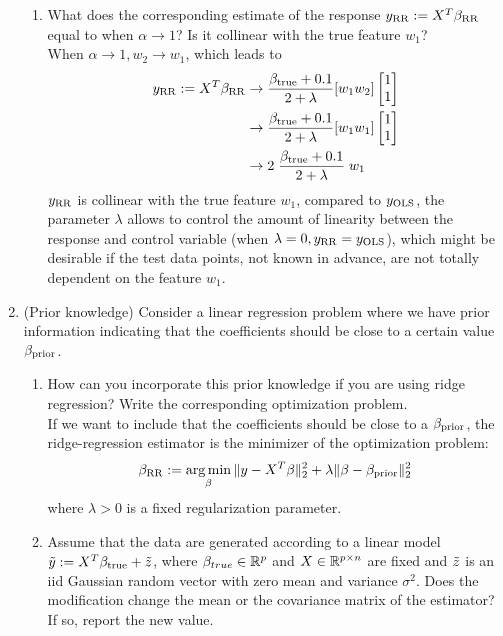 \documentclass[12pt,twoside]{article}
\begin{document}
\begin{enumerate}
\begin{enumerate}
  \item  What does the corresponding estimate of the response $y_{\operatorname{RR}} := X^T\beta_{\operatorname{RR}}$ equal to when $\alpha \rightarrow 1$? Is it collinear with the true feature $w_1$?\\
  \medskip
  When  $\alpha \rightarrow 1, w_2 \rightarrow w_1$, which leads to
 \begin{align*}
 	y_{\operatorname{RR}} := X^T\beta_{\operatorname{RR}}	&\rightarrow	\frac{ \beta_{\operatorname{true}} + 0.1}{ 2 + \lambda} [w_1 w_2]  \begin{bmatrix} 1  \\ 1 \end{bmatrix} \\
								&\rightarrow 	\frac{ \beta_{\operatorname{true}} + 0.1}{ 2 + \lambda} [w_1 w_1] \begin{bmatrix} 1  \\ 1 \end{bmatrix} \\
								&\rightarrow 	2 \;  \frac{\beta_{\operatorname{true}} + 0.1}{ 2 + \lambda} \; w_1
 \end{align*}    
  $y_{\operatorname{RR}}$ is collinear with the true feature $w_1$, compared to $y_{\operatorname{OLS}}$, the parameter $\lambda$ allows to control the amount of linearity between the response and control variable (when $\lambda=0, y_{\operatorname{RR}} = y_{\operatorname{OLS}}$), which might be desirable if the test data points, not known in advance, are not totally dependent on the feature $w_1$.
  
  \end{enumerate} 
 
 \newpage
 
 \item (Prior knowledge) Consider a linear regression problem where we have prior information indicating that the coefficients should be close to a certain value $\beta_{\operatorname{prior}}$. 
 \begin{enumerate}
 
   \item How can you incorporate this prior knowledge if you are using ridge regression? Write the corresponding optimization problem.\\
 
  \medskip
   If we want to include that the coefficients should be close to a  $\beta_{\operatorname{prior}}$, the ridge-regression estimator is the minimizer of the optimization problem:
   $$\beta_{\operatorname{RR}} := \operatorname*{arg\,min}_\beta \| y - X^T \beta \|_2^2 + \lambda \| \beta - \beta_{\operatorname{prior}} \|_2^2$$
   where $\lambda > 0$ is a fixed regularization parameter.
   
   \item Assume that the data are generated according to a linear model $\tilde{ y }:= X^T \beta_{\operatorname{true}} + \tilde{ z }$, where $\beta_{true}\in \mathbb{R}^{p}$ and $X  \in \mathbb{R}^{p \times n}$ are fixed and $\tilde{ z }$ is an iid Gaussian random vector with zero mean and variance $\sigma^2$. Does the modification change the mean or the covariance matrix of the estimator? If so, report the new value.\\
   

\end{enumerate}
\end{enumerate}
\end{document}
